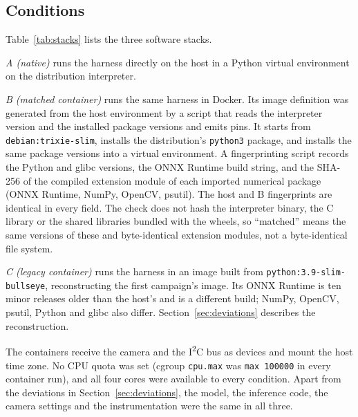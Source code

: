 \documentclass[10pt,journal,compsoc]{IEEEtran}
\begin{document}
\subsection{Conditions}
Table~\ref{tab:stacks} lists the three software stacks.

\emph{A (native)} runs the harness directly on the host in a Python virtual environment on the distribution interpreter.

\emph{B (matched container)} runs the same harness in Docker. Its image definition was generated from the host environment by a script that reads the interpreter version and the installed package versions and emits pins. It starts from \texttt{debian:trixie-slim}, installs the distribution's \texttt{python3} package, and installs the same package versions into a virtual environment. A fingerprinting script records the Python and glibc versions, the ONNX Runtime build string, and the SHA-256 of the compiled extension module of each imported numerical package (ONNX Runtime, NumPy, OpenCV, psutil). The host and B fingerprints are identical in every field. The check does not hash the interpreter binary, the C library or the shared libraries bundled with the wheels, so ``matched'' means the same versions of these and byte-identical extension modules, not a byte-identical file system.

\emph{C (legacy container)} runs the harness in an image built from \texttt{python:3.9-slim-bullseye}, reconstructing the first campaign's image. Its ONNX Runtime is ten minor releases older than the host's and is a different build; NumPy, OpenCV, psutil, Python and glibc also differ. Section~\ref{sec:deviations} describes the reconstruction.

The containers receive the camera and the I\textsuperscript{2}C bus as devices and mount the host time zone. No CPU quota was set (cgroup \texttt{cpu.max} was \texttt{max 100000} in every container run), and all four cores were available to every condition. Apart from the deviations in Section~\ref{sec:deviations}, the model, the inference code, the camera settings and the instrumentation were the same in all three.
\end{document}
